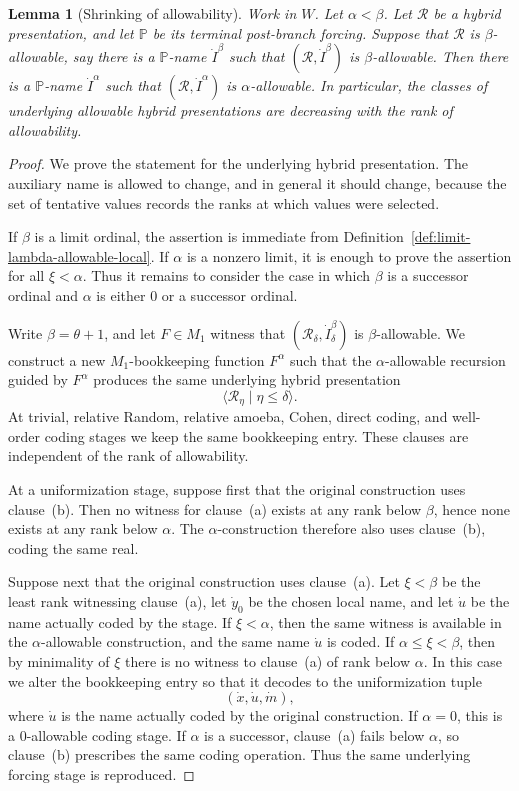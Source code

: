 \documentclass[a4paper,11pt]{article}
\newtheorem{lemma}[theorem]{Lemma}
\begin{document}
\begin{lemma}[Shrinking of allowability]
\label{lem:shrinking-allowability-local}
Work in \(W\).  Let \(\alpha<\beta\).  Let \(\mathcal R\) be a hybrid presentation,
and let \(\mathbb P\) be its terminal post-branch forcing.  Suppose that
\(\mathcal R\) is \(\beta\)-allowable, say there is a
\(\mathbb P\)-name \(\dot I^\beta\) such that \((\mathcal R,\dot I^\beta)\) is
\(\beta\)-allowable.  Then there is a \(\mathbb P\)-name \(\dot I^\alpha\) such
that \((\mathcal R,\dot I^\alpha)\) is \(\alpha\)-allowable.  In particular, the
classes of underlying allowable hybrid presentations are decreasing with the
rank of allowability.
\end{lemma}

\begin{proof}
We prove the statement for the underlying hybrid presentation.  The auxiliary
name is allowed to change, and in general it should change, because the set of
tentative values records the ranks at which values were selected.

If \(\beta\) is a limit ordinal, the assertion is immediate from
Definition~\ref{def:limit-lambda-allowable-local}.  If \(\alpha\) is a nonzero
limit, it is enough to prove the assertion for all \(\xi<\alpha\).  Thus it
remains to consider the case in which \(\beta\) is a successor ordinal and
\(\alpha\) is either \(0\) or a successor ordinal.

Write \(\beta=\theta+1\), and let \(F\in M_1\) witness that
\((\mathcal R_\delta,\dot I^\beta_\delta)\) is \(\beta\)-allowable.  We construct
a new \(M_1\)-bookkeeping function \(F^\alpha\) such that the
\(\alpha\)-allowable recursion guided by \(F^\alpha\) produces the same
underlying hybrid presentation
\[
   \langle\mathcal R_\eta\mid \eta\leq\delta\rangle.
\]
At trivial, relative Random, relative amoeba, Cohen, direct coding, and well-order coding stages
we keep the same bookkeeping entry.  These clauses are independent of the rank
of allowability.

At a uniformization stage, suppose first that the original construction uses
clause~(b).  Then no witness for clause~(a) exists at any rank below \(\beta\),
hence none exists at any rank below \(\alpha\).  The \(\alpha\)-construction
therefore also uses clause~(b), coding the same real.

Suppose next that the original construction uses clause~(a).  Let
\(\xi<\beta\) be the least rank witnessing clause~(a), let \(\dot y_0\) be the
chosen local name, and let \(\dot u\) be the name actually coded by the stage.
If \(\xi<\alpha\), then the same witness is available in the
\(\alpha\)-allowable construction, and the same name \(\dot u\) is coded.  If
\(\alpha\leq\xi<\beta\), then by minimality of \(\xi\) there is no witness to
clause~(a) of rank below \(\alpha\).  In this case we alter the bookkeeping
entry so that it decodes to the uniformization tuple
\[
   (\dot x,\dot u,\dot m),
\]
where \(\dot u\) is the name actually coded by the original construction.  If
\(\alpha=0\), this is a \(0\)-allowable coding stage.  If \(\alpha\) is a
successor, clause~(a) fails below \(\alpha\), so clause~(b) prescribes the same
coding operation.  Thus the same underlying forcing stage is reproduced.


\end{proof}
\end{document}
